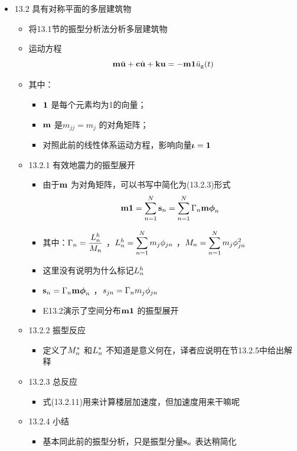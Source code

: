 \documentclass[11pt]{article}
\begin{document}
\begin{itemize}
\begin{itemize}
\begin{itemize}
\end{itemize}
\end{itemize}
\item 13.2 具有对称平面的多层建筑物
\label{sec:org4e96973}
\begin{itemize}
\item 将13.1节的振型分析法分析多层建筑物
\item 运动方程 $$ \bm{\mathrm{m}} \ddot{\bm{\mathrm{u}}} + \bm{\mathrm{c}} \dot{\bm{\mathrm{u}}} + \bm{\mathrm{k}} \bm{\mathrm{u}} = - \bm{\mathrm{m}} \textbf{1} \ddot{u}_\mathrm{g}(t)  $$
\item 其中：
\begin{itemize}
\item \(\textbf{1}\) 是每个元素均为1的向量；
\item \(\bm{\mathrm{m}}\) 是\(m_{jj}=m_{j}\) 的对角矩阵；
\item 对照此前的线性体系运动方程，影响向量\(\bm{\mathrm{\iota}} = \textbf{1}\)
\end{itemize}
\end{itemize}
\begin{itemize}
\item 13.2.1 有效地震力的振型展开
\label{sec:orgca51aa6}
\begin{itemize}
\item 由于\(\bm{\mathrm{m}}\) 为对角矩阵，可以书写中简化为(13.2.3)形式
$$\bm{\mathrm{m}} \textbf{1} = \displaystyle\sum_{n=1}^{N} \bm{\mathrm{s}}_{n} = \displaystyle\sum_{n=1}^{N} \Gamma_{n} \bm{\mathrm{m}} \bm{\mathrm{\phi}}_{n}$$
\item 其中：\(\Gamma_{n} = \dfrac{L^{h}_{n}}{M_{n}}\) ，\(L^{h}_{n}=\displaystyle\sum_{n=1}^{N} m_{j}\phi_{jn}\) ，\(M_{n}=\displaystyle\sum_{n=1}^{N} m_{j}\phi^{2}_{jn}\)
\item 这里没有说明为什么标记\(L^{h}_{n}\)
\item \(\bm{\mathrm{s}}_{n} = \Gamma_{n} \bm{\mathrm{m}} \bm{\mathrm{\phi}}_{n}\) ，\(s_{jn} = \Gamma_{n} m_{j} \phi_{jn}\)
\item E13.2演示了空间分布\(\bm{\mathrm{m}} \textbf{1}\) 的振型展开
\end{itemize}
\item 13.2.2 振型反应
\label{sec:orgdaf5229}
\begin{itemize}
\item 定义了\(M^{*}_{n}\) 和\(L^{*}_{n}\) 不知道是意义何在，译者应说明在节13.2.5中给出解释
\end{itemize}
\item 13.2.3 总反应
\label{sec:orgad9bfc3}
\begin{itemize}
\item 式(13.2.11)用来计算楼层加速度，但加速度用来干嘛呢
\end{itemize}
\item 13.2.4 小结
\label{sec:orgaec845f}
\begin{itemize}
\item 基本同此前的振型分析，只是振型分量\(\bm{\mathrm{s}}_{n}\) 表达稍简化

\end{itemize}
\end{itemize}
\end{itemize}
\end{document}
